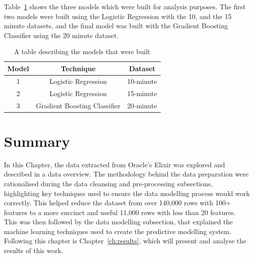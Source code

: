 Table~\ref{tab:ModelsBuilt} shows the three models which were built for analysis purposes.
The first two models were built using the Logistic Regression with the 10, and the 15 minute datasets, and the final model was built with the Gradient Boosting Classifier using the 20 minute dataset.

\begin{table}[h!]
\centering
\caption{A table describing the models that were built}
\begin{tabular}{ c c c }
 \hline
 Model & Technique & Dataset \\ [0.5ex]
 \hline
 1 & Logistic Regression & 10-minute \\
 2 & Logistic Regression & 15-minute \\
 3 & Gradient Boosting Classifier & 20-minute \\[1ex]
 \hline
\end{tabular}
\label{tab:ModelsBuilt}
\end{table}

\section{Summary}\label{sec:MethodSummary}
In this Chapter, the data extracted from Oracle's Elixir was explored and described in a data overview.
The methodology behind the data preparation were rationalised during the data cleansing and pre-processing subsections, highlighting key techniques used to ensure the data modelling process would work correctly.
This helped reduce the dataset from over 140,000 rows with 100+ features to a more succinct and useful 11,000 rows with less than 20 features.
This was then followed by the data modelling subsection, that explained the machine learning techniques used to create the predictive modelling system.
Following this chapter is Chapter~\ref{ch:results}, which will present and analyse the results of this work.


